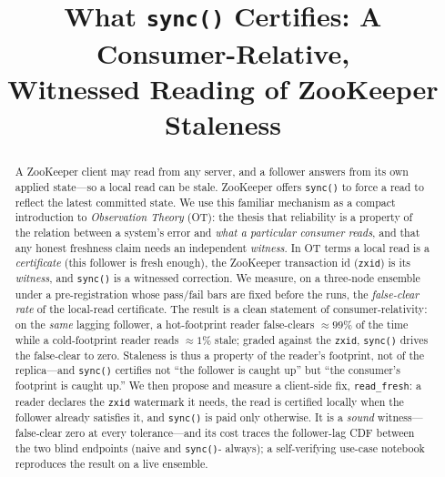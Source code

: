 \documentclass[conference]{IEEEtran}
\begin{document}
\title{What \texttt{sync()} Certifies: A Consumer-Relative,\\ Witnessed Reading of ZooKeeper Staleness}

\author{
}
\maketitle

\begin{abstract}
A ZooKeeper client may read from any server, and a follower answers from its own
applied state---so a local read can be stale. ZooKeeper offers \texttt{sync()} to
force a read to reflect the latest committed state. We use this familiar
mechanism as a compact introduction to \emph{Observation Theory} (OT): the thesis
that reliability is a property of the relation between a system's error and
\emph{what a particular consumer reads}, and that any honest freshness claim needs
an independent \emph{witness}. In OT terms a local read is a \emph{certificate}
(this follower is fresh enough), the ZooKeeper transaction id (\texttt{zxid}) is
its \emph{witness}, and \texttt{sync()} is a witnessed correction. We measure, on
a three-node ensemble under a pre-registration whose pass/fail bars are fixed
before the runs, the \emph{false-clear rate} of the local-read certificate. The result is a clean statement of
consumer-relativity: on the \emph{same} lagging follower, a hot-footprint reader
false-clears $\approx99\%$ of the time while a cold-footprint reader reads
$\approx1\%$ stale; graded against the \texttt{zxid}, \texttt{sync()} drives the
false-clear to zero. Staleness is thus a property of the reader's footprint, not
of the replica---and \texttt{sync()} certifies not ``the follower is caught up''
but ``the consumer's footprint is caught up.'' We then propose and measure a
client-side fix, \texttt{read\_fresh}: a reader declares the \texttt{zxid}
watermark it needs, the read is certified locally when the follower already
satisfies it, and \texttt{sync()} is paid only otherwise. It is a \emph{sound}
witness---false-clear zero at every tolerance---and its cost traces the
follower-lag CDF between the two blind endpoints (naive and \texttt{sync()}-
always); a self-verifying use-case notebook reproduces the result on a live
ensemble.
\end{abstract}
\end{document}
